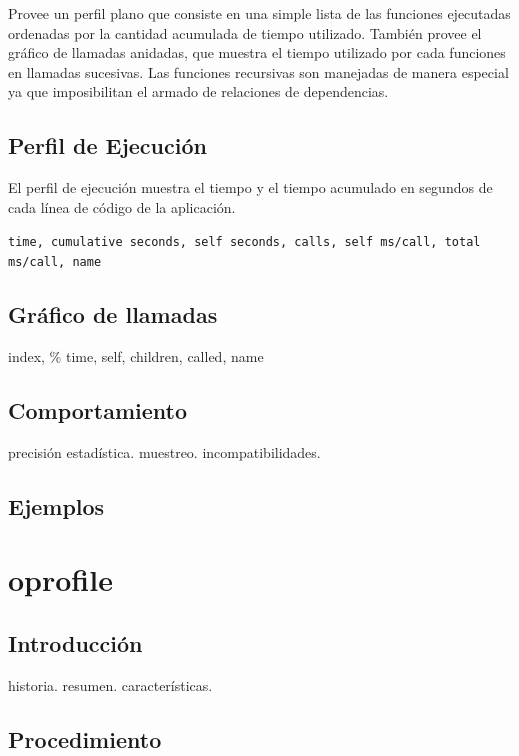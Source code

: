\documentclass[a4paper]{report}
\begin{document}
\bigskip

Provee un perfil plano que consiste en una simple lista de las funciones
ejecutadas ordenadas por la cantidad acumulada de tiempo utilizado.
Tambi\'en provee el gr\'afico de llamadas anidadas, que muestra el tiempo
utilizado por cada funciones en llamadas sucesivas. Las funciones recursivas
son manejadas de manera especial ya que imposibilitan el armado de relaciones
de dependencias.

\subsection{Perfil de Ejecuci\'on}

El perfil de ejecuci\'on muestra el tiempo y el tiempo acumulado en segundos
de cada l\'inea de c\'odigo de la aplicaci\'on.

{\tt time, cumulative seconds, self seconds, calls, self ms/call,
  total ms/call, name}

\subsection{Gr\'afico de llamadas}

index, \% time, self, children, called, name

\subsection{Comportamiento}

precisi\'on estad\'istica. muestreo. incompatibilidades.

\subsection{Ejemplos}

\section{oprofile}

\subsection{Introducci\'on}

historia. resumen. caracter\'isticas. 

\subsection{Procedimiento}
\end{document}
